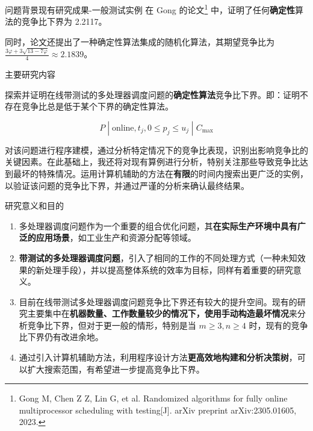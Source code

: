 \begin{frame}{问题背景}{现有研究成果-一般测试实例}
    在 Gong 的论文\footnote{Gong M, Chen Z Z, Lin G, et al. Randomized algorithms for fully online multiprocessor scheduling with testing[J]. arXiv preprint arXiv:2305.01605, 2023.} 中，证明了任何\textbf{确定性}算法的竞争比下界为 2.2117。
    
    同时，论文还提出了一种确定性算法集成的随机化算法，其期望竞争比为 $\frac{3\varphi+3\sqrt{13-7\varphi}}{4}\approx 2.1839$。

\end{frame}

\begin{frame}{主要研究内容}{}

    探索并证明在线带测试的多处理器调度问题的\textbf{确定性算法}竞争比下界。即：证明不存在竞争比总是低于某个下界的确定性算法。

    \[
        P \; | \; \text{online}, t_j, 0\leq p_j \leq u_j \; |\; C_{\text{max}}
    \]

    对该问题进行程序建模，通过分析特定情况下的竞争比表现，识别出影响竞争比的关键因素。在此基础上，我还将对现有算例进行分析，特别关注那些导致竞争比达到最坏的特殊情况。运用计算机辅助的方法在\textbf{有限}的时间内搜索出更广泛的实例，以验证该问题的竞争比下界，并通过严谨的分析来确认最终结果。
\end{frame}

\begin{frame}{研究意义和目的}{}
\begin{enumerate}
    \item 多处理器调度问题作为一个重要的组合优化问题，其\textbf{在实际生产环境中具有广泛的应用场景}，如工业生产和资源分配等领域。

    \item \textbf{带测试的多处理器调度问题}，引入了相同的工作的不同处理方式（一种未知效果的新处理手段），并以提高整体系统的效率为目标，同样有着重要的研究意义。

    \item 目前在线带测试多处理器调度问题竞争比下界还有较大的提升空间。现有的研究主要集中在\textbf{机器数量、工作数量较少的情况下，使用手动构造最坏情况}来分析竞争比下界，但对于更一般的情形，特别是当 $m \geq 3, n\geq 4$ 时，现有的竞争比下界仍有改进余地。

    \item 通过引入计算机辅助方法，利用程序设计方法\textbf{更高效地构建和分析决策树}，可以扩大搜索范围，有希望进一步提高竞争比下界。
\end{enumerate}

\end{frame}

